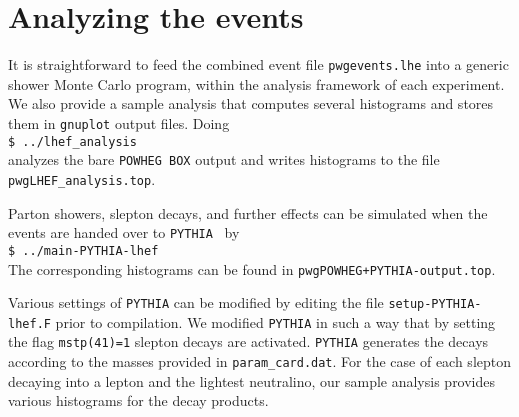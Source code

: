\documentclass[a4paper,11pt]{article}
\newcommand\PYTHIA{{\tt PYTHIA}}
\begin{document}
\section*{Analyzing the events}

It is straightforward to feed the combined
event file {\tt pwgevents.lhe} into a generic
shower Monte Carlo program, within the analysis framework of each
experiment. We also provide a sample analysis that computes several
histograms and stores them in {\tt gnuplot} output files. Doing
\\[2ex]
{\tt \$ ../lhef\_analysis}
\\[2ex]
analyzes the bare {\tt POWHEG BOX} output and writes
histograms to the file {\tt pwgLHEF\_analysis.top}.

Parton showers, slepton decays, and further effects
can be simulated when the events are
handed over to \PYTHIA{}~\cite{Sjostrand:2006za} by
\\[2ex]
{\tt \$ ../main-PYTHIA-lhef}
\\[2ex]
The corresponding histograms can be found in
{\tt pwgPOWHEG+PYTHIA-output.top}.

Various settings of \PYTHIA{}
can be modified by editing the file
{\tt setup-PYTHIA-lhef.F} prior to compilation.
We modified \PYTHIA{} in such a way that by
setting the flag {\tt mstp(41)=1} slepton decays are activated.  
\PYTHIA{} generates the decays according to the masses
provided in {\tt param\_card.dat}.
For the case of each slepton decaying into
a lepton and the lightest neutralino,
our sample analysis provides various histograms for the decay products. 
\end{document}
